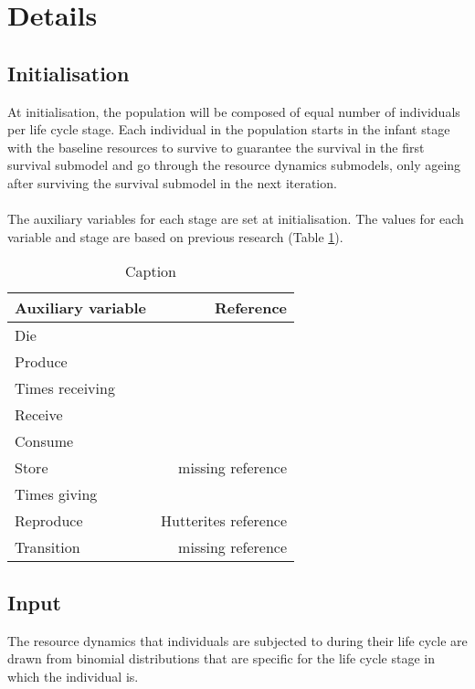 \documentclass{article}
\begin{document}
\section{Details}

\subsection{Initialisation}

At initialisation, the population will be composed of equal number of individuals per life cycle stage. Each individual in the population starts in the infant stage with the baseline resources to survive to guarantee the survival in the first survival submodel and go through the resource dynamics submodels, only ageing after surviving the survival submodel in the next iteration.
\\\\
The auxiliary variables for each stage are set at initialisation. The values for each variable and stage are based on previous research (Table \ref{tab:1}).

\begin{table}[h!]
    \centering
    \begin{tabular}{ l r }
    \hline
    Auxiliary variable & Reference \\ 
    \hline
    Die & \cite{gurven2007longevity} \\  
    Produce & \cite{koster2020life} \\  
    Times receiving & \cite{gurven2004give} \\  
    Receive & \cite{gurven2004give} \\  
    Consume & \cite{kaplan2000theory} \\  
    Store & missing reference \\  
    Times giving & \cite{gurven2004give} \\  
    Reproduce & Hutterites reference \\  
    Transition & missing reference  \\
    \hline
    \end{tabular}
    \caption{Caption}
    \label{tab:1}
\end{table}

\subsection{Input}

The resource dynamics that individuals are subjected to during their life cycle are drawn from binomial distributions that are specific for the life cycle stage in which the individual is.
\end{document}
